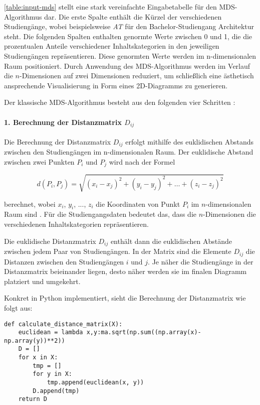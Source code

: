 \autoref{table:input-mds} stellt eine stark vereinfachte Eingabetabelle für den
MDS-Algorithmus dar. Die erste Spalte enthält die Kürzel der verschiedenen
Studiengänge, wobei beispielsweise \textit{AT} für den Bachelor-Studiengang
Architektur steht. Die folgenden Spalten enthalten genormte Werte zwischen 0 und
1, die die prozentualen Anteile verschiedener Inhaltskategorien in den
jeweiligen Studiengängen repräsentieren. Diese genormten Werte werden im
n-dimensionalen Raum positioniert. Durch Anwendung des MDS-Algorithmus werden im
Verlauf die $n$-Dimensionen auf zwei Dimensionen reduziert, um schließlich eine
ästhetisch ansprechende Visualisierung in Form eines 2D-Diagramms zu generieren.

\noindent
Der klassische MDS-Algorithmus besteht aus den folgenden vier Schritten
\parencite{imperial_multidimensional_2019}:

\paragraph*{1. Berechnung der Distanzmatrix $ D_{ij} $}\label{sec:distanzmatrix}
Die Berechnung der Distanzmatrix $ D_{ij} $ erfolgt mithilfe des euklidischen
Abstands zwischen den Studiengängen im n-dimensionalen Raum. Der euklidische
Abstand zwischen zwei Punkten $ P_{i} $ und $ P_{j} $ wird nach der Formel

$$ d(P_i, P_j) = \sqrt{(x_i - x_j)^2 + (y_i - y_j)^2 + \ldots + (z_i - z_j)^2} $$

berechnet, wobei $ x_{i} $, $ y_{i} $, ..., $ z_{i} $ die Koordinaten von Punkt
$ P_{i} $ im $n$-dimensionalen Raum sind \parencite{ceopedia_multidimensional_2018}. Für die
Studiengangsdaten bedeutet das, dass die $n$-Dimensionen die verschiedenen
Inhaltskategorien repräsentieren.

Die euklidische Distanzmatrix $ D_{ij} $ enthält dann die euklidischen Abstände
zwischen jedem Paar von Studiengängen. In der Matrix sind die Elemente
$ D_{ij} $ die Distanzen zwischen den Studiengängen $ i $ und $ j $. Je näher
die Studiengänge in der Distanzmatrix beieinander liegen, desto näher werden sie
im finalen Diagramm platziert und umgekehrt.

Konkret in Python implementiert, sieht die Berechnung der Distanzmatrix wie
folgt aus:

\begin{lstlisting}[style=Python]
def calculate_distance_matrix(X):
    euclidean = lambda x,y:ma.sqrt(np.sum((np.array(x)-np.array(y))**2))
    D = []
    for x in X:
        tmp = []
        for y in X:
            tmp.append(euclidean(x, y))
        D.append(tmp)
    return D
\end{lstlisting}

